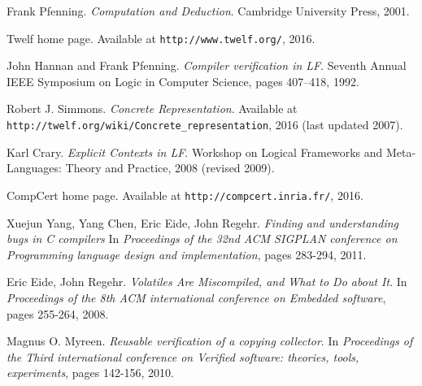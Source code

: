 \clearpage

\begin{thebibliography}{9}

Frank Pfenning.
\textit{Computation and Deduction}.
Cambridge University Press, 2001.

Twelf home page. Available at \texttt{http://www.twelf.org/}, 2016.

John Hannan and Frank Pfenning.
\textit{Compiler verification in LF}.
Seventh Annual IEEE Symposium on Logic in Computer Science, pages 407–418, 1992.

Robert J. Simmons.
\textit{Concrete Representation}.
Available at \texttt{http://twelf.org/wiki/Concrete\_representation}, 2016 (last updated 2007).

Karl Crary.
\textit{Explicit Contexts in LF}.
Workshop on Logical Frameworks and Meta-Languages: Theory and Practice, 2008 (revised 2009).

CompCert home page. Available at \texttt{http://compcert.inria.fr/}, 2016.

Xuejun Yang, Yang Chen, Eric Eide, John Regehr.
\textit{Finding and understanding bugs in C compilers}
In \textit{Proceedings of the 32nd ACM SIGPLAN conference on Programming language design and implementation}, pages 283-294, 2011.

Eric Eide, John Regehr.
\textit{Volatiles Are Miscompiled, and What to Do about It}.
In \textit{Proceedings of the 8th ACM international conference on Embedded software}, pages 255-264, 2008.

Magnus O. Myreen.
\textit{Reusable verification of a copying collector}.
In \textit{Proceedings of the Third international conference on Verified software: theories, tools, experiments}, pages 142-156, 2010.

\end{thebibliography}
